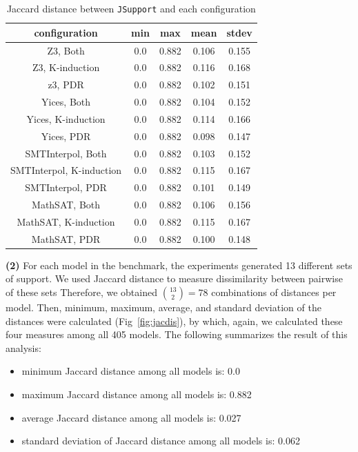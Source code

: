 \begin{table}
  \centering
  \begin{tabular}{|c|c|c|c|c|}
    \hline
    configuration & min & max & mean & stdev  \\[0.5ex]
    \hline\hline
    Z3, Both & 0.0 & 0.882 & 0.106 & 0.155 \\[0.5ex]
    Z3, K-induction & 0.0 & 0.882 & 0.116 & 0.168 \\[0.5ex]
    z3, PDR & 0.0 & 0.882 & 0.102 & 0.151 \\[0.5ex]
    \hline
    Yices, Both & 0.0 & 0.882 & 0.104 & 0.152 \\[0.5ex]
    Yices, K-induction & 0.0 & 0.882 & 0.114 & 0.166 \\[0.5ex]
    Yices, PDR & 0.0 & 0.882 & 0.098 & 0.147 \\[0.5ex]
    \hline
    SMTInterpol, Both & 0.0 & 0.882 & 0.103 & 0.152 \\[0.5ex]
    SMTInterpol, K-induction & 0.0 & 0.882 & 0.115 & 0.167 \\[0.5ex]
    SMTInterpol, PDR & 0.0 & 0.882 & 0.101 & 0.149 \\[0.5ex]
    \hline
    MathSAT, Both & 0.0 & 0.882 & 0.106 & 0.156 \\[0.5ex]
    MathSAT, K-induction & 0.0 & 0.882 & 0.115 & 0.167 \\[0.5ex]
    MathSAT, PDR & 0.0 & 0.882 & 0.100 & 0.148 \\[0.5ex]
    \hline
  \end{tabular}
  \caption{Jaccard distance between \texttt{JSupport} and each configuration}\label{tab:jsupconf}
\end{table}

\vspace{6pt}
\noindent{}
 \vspace{9pt}
 
\textbf{(2)} For each model in the benchmark, the experiments generated 13 different sets of support.
We used Jaccard distance to measure dissimilarity between pairwise of these sets
Therefore, we obtained $\binom{13}{2} = 78$ combinations of distances per model. Then, minimum, maximum, average, and standard deviation of the distances were calculated (Fig~\ref{fig:jacdis}), by which, again, we calculated these four measures among all 405 models. The following summarizes the result of this analysis:
\begin{itemize}
  \item minimum Jaccard distance among all models is: 0.0
  \item maximum Jaccard distance among all models is: 0.882
  \item average Jaccard distance among all models is: 0.027
  \item standard deviation of Jaccard distance among all models is: 0.062
\end{itemize}

